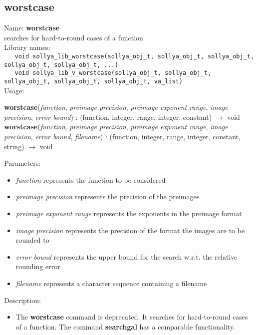 \subsection{worstcase}
\label{labworstcase}
\noindent Name: \textbf{worstcase}\\
\phantom{aaa}searches for hard-to-round cases of a function\\[0.2cm]
\noindent Library names:\\
\verb|   void sollya_lib_worstcase(sollya_obj_t, sollya_obj_t, sollya_obj_t, sollya_obj_t, sollya_obj_t, ...)|\\
\verb|   void sollya_lib_v_worstcase(sollya_obj_t, sollya_obj_t, sollya_obj_t, sollya_obj_t, sollya_obj_t, va_list)|\\[0.2cm]
\noindent Usage: 
\begin{center}
\textbf{worstcase}(\emph{function}, \emph{preimage precision}, \emph{preimage exponent range}, \emph{image precision}, \emph{error bound}) : (\textsf{function}, \textsf{integer}, \textsf{range}, \textsf{integer}, \textsf{constant}) $\rightarrow$ \textsf{void}\\
\textbf{worstcase}(\emph{function}, \emph{preimage precision}, \emph{preimage exponent range}, \emph{image precision}, \emph{error bound}, \emph{filename}) : (\textsf{function}, \textsf{integer}, \textsf{range}, \textsf{integer}, \textsf{constant}, \textsf{string}) $\rightarrow$ \textsf{void}\\
\end{center}
Parameters: 
\begin{itemize}
\item \emph{function} represents the function to be considered
\item \emph{preimage precision} represents the precision of the preimages
\item \emph{preimage exponent range} represents the exponents in the preimage format
\item \emph{image precision} represents the precision of the format the images are to be rounded to
\item \emph{error bound} represents the upper bound for the search w.r.t. the relative rounding error
\item \emph{filename} represents a character sequence containing a filename
\end{itemize}
\noindent Description: \begin{itemize}

\item The \textbf{worstcase} command is deprecated. It searches for hard-to-round cases of
   a function. The command \textbf{searchgal} has a comparable functionality.
\end{itemize}
